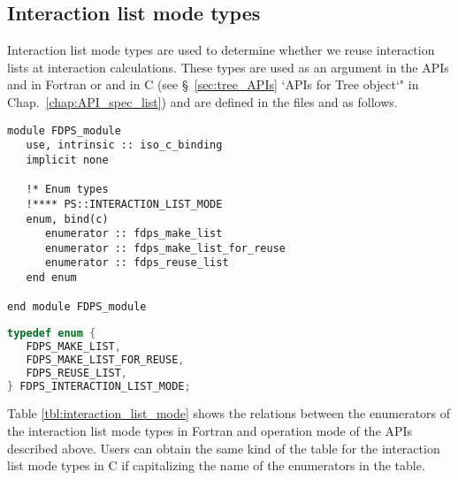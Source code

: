 \subsection{Interaction list mode types}
\label{subsec:enum_list_mode}
Interaction list mode types are used to determine whether we reuse interaction lists at interaction calculations. These types are used as an argument in the APIs  and  in Fortran or  and  in C (see \S~\ref{sec:tree_APIs} `APIs for Tree object`" in Chap.~\ref{chap:API_spec_list}) and are defined in the files  and  as follows.

\begin{lstlisting}[caption=Interaction list mode types (Fortran)]
module FDPS_module
   use, intrinsic :: iso_c_binding
   implicit none
   
   !* Enum types
   !**** PS::INTERACTION_LIST_MODE
   enum, bind(c)
      enumerator :: fdps_make_list
      enumerator :: fdps_make_list_for_reuse
      enumerator :: fdps_reuse_list
   end enum
   
end module FDPS_module
\end{lstlisting}

\begin{lstlisting}[language=C,caption=Interaction list mode types (C)]
typedef enum {
   FDPS_MAKE_LIST,
   FDPS_MAKE_LIST_FOR_REUSE,
   FDPS_REUSE_LIST,
} FDPS_INTERACTION_LIST_MODE;  
\end{lstlisting}

Table \ref{tbl:interaction_list_mode} shows the relations between the enumerators of the interaction list mode types in Fortran and operation mode of the APIs described above. Users can obtain the same kind of the table for the interaction list mode types in C if capitalizing the name of the enumerators in the table.

